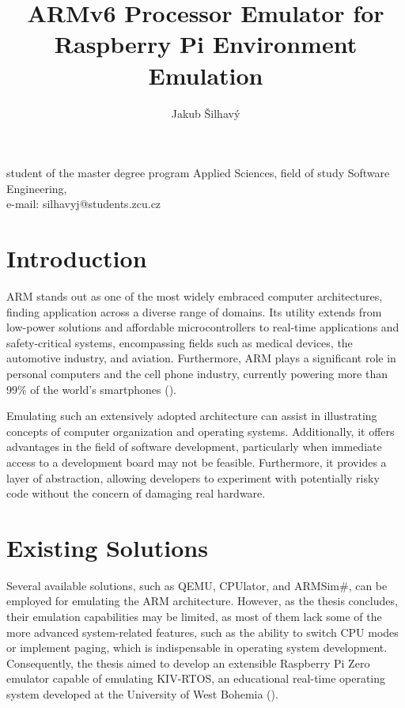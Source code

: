 \documentclass{template_svk}
\begin{document}
\title{ARMv6 Processor Emulator for\\Raspberry Pi Environment Emulation}

 \author{Jakub Šilhavý}{student of the master
   degree program Applied Sciences, field of study Software Engineering,\\e-mail: silhavyj@students.zcu.cz}

\maketitle

\section{Introduction}

ARM stands out as one of the most widely embraced  computer architectures, finding application across a diverse range of domains. Its utility extends from low-power solutions and affordable microcontrollers to real-time applications and safety-critical systems, encompassing fields such as medical devices, the automotive industry, and aviation. Furthermore, ARM plays a significant role in personal computers and the cell phone industry, currently powering more than 99\% of the world's smartphones (\cite{ARM-history}).

Emulating such an extensively adopted architecture can assist in illustrating concepts of computer organization and operating systems. Additionally, it offers advantages in the field of software development, particularly when immediate access to a development board may not be feasible. Furthermore, it provides a layer of abstraction, allowing developers to experiment with potentially risky code without the concern of damaging real hardware.


\section{Existing Solutions}

Several available solutions, such as QEMU, CPUlator, and ARMSim\#, can be employed for emulating the ARM architecture. However, as the thesis concludes, their emulation capabilities may be limited, as most of them lack some of the more advanced system-related features, such as the ability to switch CPU modes or implement paging, which is indispensable in operating system development. Consequently, the thesis aimed to develop an extensible Raspberry Pi Zero emulator capable of emulating KIV-RTOS, an educational real-time operating system developed at the University of West Bohemia (\cite{KIV-RTOS}).
\end{document}
